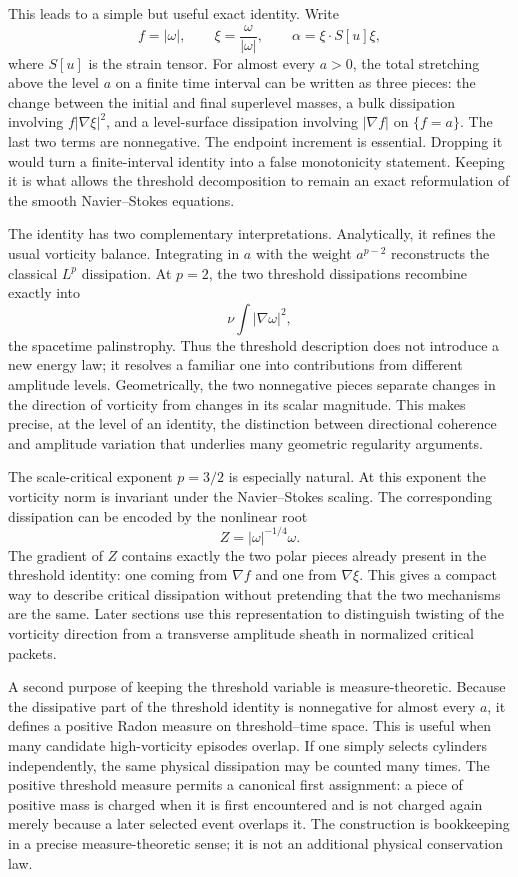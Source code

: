 \documentclass[11pt]{article}
\theoremstyle{definition}\newtheorem{definition}[theorem]{Definition}
\theoremstyle{remark}\newtheorem{remark}[theorem]{Remark}
\begin{document}
This leads to a simple but useful exact identity.  Write
\[
f=|\omega|,\qquad \xi=\frac{\omega}{|\omega|},\qquad
\alpha=\xi\cdot S[u]\xi,
\]
where $S[u]$ is the strain tensor.  For almost every $a>0$, the total stretching above the level $a$ on a finite time interval can be written as three pieces: the change between the initial and final superlevel masses, a bulk dissipation involving $f|\nabla\xi|^2$, and a level-surface dissipation involving $|\nabla f|$ on $\{f=a\}$.  The last two terms are nonnegative.  The endpoint increment is essential.  Dropping it would turn a finite-interval identity into a false monotonicity statement.  Keeping it is what allows the threshold decomposition to remain an exact reformulation of the smooth Navier--Stokes equations.

The identity has two complementary interpretations.  Analytically, it refines the usual vorticity balance.  Integrating in $a$ with the weight $a^{p-2}$ reconstructs the classical $L^p$ dissipation.  At $p=2$, the two threshold dissipations recombine exactly into
\[
\nu\int|\nabla\omega|^2,
\]
the spacetime palinstrophy.  Thus the threshold description does not introduce a new energy law; it resolves a familiar one into contributions from different amplitude levels.  Geometrically, the two nonnegative pieces separate changes in the direction of vorticity from changes in its scalar magnitude.  This makes precise, at the level of an identity, the distinction between directional coherence and amplitude variation that underlies many geometric regularity arguments.

The scale-critical exponent $p=3/2$ is especially natural.  At this exponent the vorticity norm is invariant under the Navier--Stokes scaling.  The corresponding dissipation can be encoded by the nonlinear root
\[
Z=|\omega|^{-1/4}\omega.
\]
The gradient of $Z$ contains exactly the two polar pieces already present in the threshold identity: one coming from $\nabla f$ and one from $\nabla\xi$.  This gives a compact way to describe critical dissipation without pretending that the two mechanisms are the same.  Later sections use this representation to distinguish twisting of the vorticity direction from a transverse amplitude sheath in normalized critical packets.

A second purpose of keeping the threshold variable is measure-theoretic.  Because the dissipative part of the threshold identity is nonnegative for almost every $a$, it defines a positive Radon measure on threshold--time space.  This is useful when many candidate high-vorticity episodes overlap.  If one simply selects cylinders independently, the same physical dissipation may be counted many times.  The positive threshold measure permits a canonical first assignment: a piece of positive mass is charged when it is first encountered and is not charged again merely because a later selected event overlaps it.  The construction is bookkeeping in a precise measure-theoretic sense; it is not an additional physical conservation law.
\end{document}
